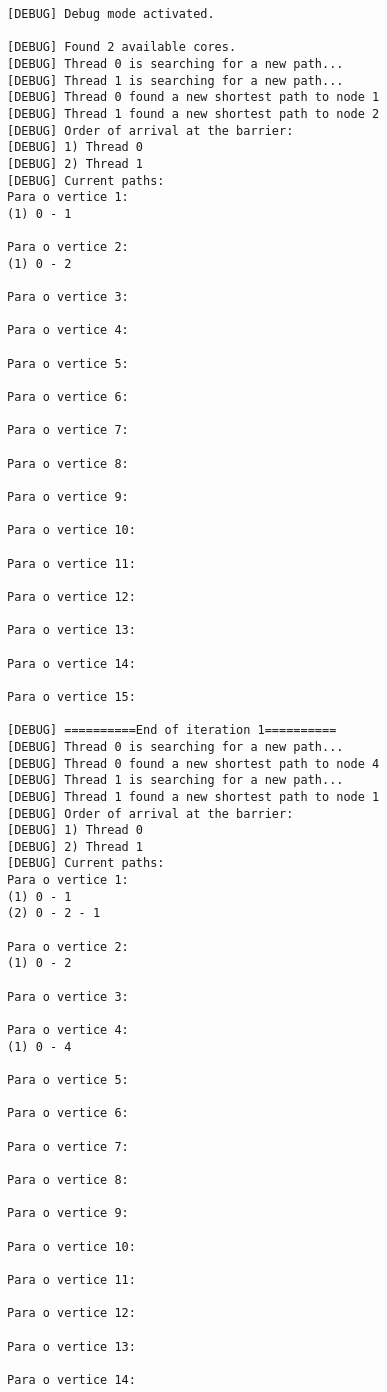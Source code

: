 \documentclass[a4paper,11pt]{article}
\begin{document}
\begin{verbatim}
[DEBUG] Debug mode activated.

[DEBUG] Found 2 available cores.
[DEBUG] Thread 0 is searching for a new path...
[DEBUG] Thread 1 is searching for a new path...
[DEBUG] Thread 0 found a new shortest path to node 1
[DEBUG] Thread 1 found a new shortest path to node 2
[DEBUG] Order of arrival at the barrier:
[DEBUG] 1) Thread 0
[DEBUG] 2) Thread 1
[DEBUG] Current paths:
Para o vertice 1:
(1) 0 - 1

Para o vertice 2:
(1) 0 - 2

Para o vertice 3:

Para o vertice 4:

Para o vertice 5:

Para o vertice 6:

Para o vertice 7:

Para o vertice 8:

Para o vertice 9:

Para o vertice 10:

Para o vertice 11:

Para o vertice 12:

Para o vertice 13:

Para o vertice 14:

Para o vertice 15:

[DEBUG] ==========End of iteration 1==========
[DEBUG] Thread 0 is searching for a new path...
[DEBUG] Thread 0 found a new shortest path to node 4
[DEBUG] Thread 1 is searching for a new path...
[DEBUG] Thread 1 found a new shortest path to node 1
[DEBUG] Order of arrival at the barrier:
[DEBUG] 1) Thread 0
[DEBUG] 2) Thread 1
[DEBUG] Current paths:
Para o vertice 1:
(1) 0 - 1
(2) 0 - 2 - 1

Para o vertice 2:
(1) 0 - 2

Para o vertice 3:

Para o vertice 4:
(1) 0 - 4

Para o vertice 5:

Para o vertice 6:

Para o vertice 7:

Para o vertice 8:

Para o vertice 9:

Para o vertice 10:

Para o vertice 11:

Para o vertice 12:

Para o vertice 13:

Para o vertice 14:


\end{verbatim}
\end{document}
